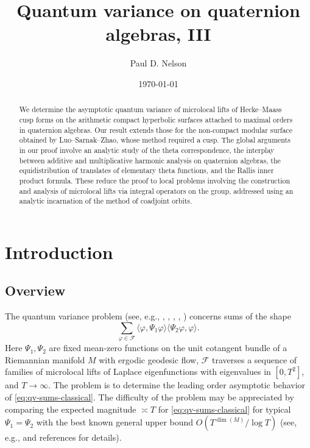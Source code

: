 \documentclass[reqno,10pt]{amsart}
\author{Paul D. Nelson}
\date{\today}
\title{Quantum variance on quaternion algebras, III}
\theoremstyle{plain} %
\theoremstyle{definition}
\theoremstyle{plain} %
\theoremstyle{remark}
\theoremstyle{itplain} %
\theoremstyle{remark} %
\numberwithin{equation}{section}
\begin{document}
\begin{abstract}
  We determine the asymptotic quantum variance of microlocal lifts of Hecke--Maass cusp forms on the arithmetic compact hyperbolic surfaces attached to maximal orders in quaternion algebras.  Our result extends those for the non-compact modular surface obtained by Luo--Sarnak--Zhao, whose method required a cusp.  The global arguments in our proof involve an analytic study of the theta correspondence, the interplay between additive and multiplicative harmonic analysis on quaternion algebras, the equidistribution of translates of elementary theta functions, and the Rallis inner product formula.  These reduce the proof to local problems involving the construction and analysis of microlocal lifts via integral operators on the group, addressed using an analytic incarnation of the method of coadjoint orbits.
\end{abstract}
\maketitle

\setcounter{tocdepth}{1} \tableofcontents

  
\section{Introduction}\label{sec-1}
\subsection{Overview}\label{sec-1-1}
The quantum variance problem (see, e.g.,  \cite[\S1]{nelson-variance-73-2}, \cite{MR848319}, \cite[\S15.6]{2009arXiv0911.4312Z}, \cite[\S4.1.3]{MR3204186}, \cite{ 2013arXiv1303.6972S, MR1361757,MR1465794,luo-sarnak-mass,MR2103474,MR2651907}) concerns sums of the shape
\begin{equation}\label{eq:qv-sums-classical}
  \sum_{\varphi \in \mathcal{F}}
  \langle \varphi, \Psi_1 \varphi \rangle
  \langle \Psi_2 \varphi, \varphi \rangle.
\end{equation}
Here $\Psi_1,\Psi_2$ are fixed mean-zero functions on the unit cotangent bundle of a Riemannian manifold $M$ with ergodic geodesic flow, $\mathcal{F}$ traverses a sequence of families of microlocal lifts of Laplace eigenfunctions with eigenvalues in $[0, T^2]$, and $T \rightarrow \infty$.  The problem is to determine the leading order asymptotic behavior of \eqref{eq:qv-sums-classical}.  The difficulty of the problem may be appreciated by comparing the expected magnitude $\asymp T$ for \eqref{eq:qv-sums-classical} for typical $\Psi_1 = \Psi_2$ with the best known general upper bound $O(T^{\dim(M)} / \log T)$ (see, e.g., \cite[\S1]{nelson-variance-73-2} and references for details).
\end{document}
